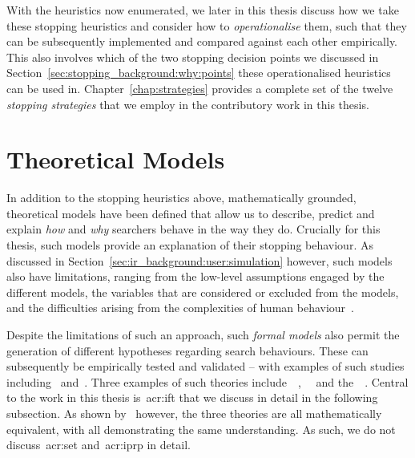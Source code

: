 With the heuristics now enumerated, we later in this thesis discuss how we take these stopping heuristics and consider how to \emph{operationalise} them, such that they can be subsequently implemented and compared against each other empirically. This also involves which of the two stopping decision points we discussed in Section~\ref{sec:stopping_background:why:points} these operationalised heuristics can be used in. Chapter~\ref{chap:strategies} provides a complete set of the twelve \emph{stopping strategies} that we employ in the contributory work in this thesis.

\section{Theoretical Models}\label{sec:stopping_background:theoretical}
In addition to the stopping heuristics above, mathematically grounded, theoretical models have been defined that allow us to describe, predict and explain \emph{how} and \emph{why} searchers behave in the way they do. Crucially for this thesis, such models provide an explanation of their stopping behaviour. As discussed in Section~\ref{sec:ir_background:user:simulation} however, such models also have limitations, ranging from the low-level assumptions engaged by the different models, the variables that are considered or excluded from the models, and the difficulties arising from the complexities of human behaviour~\citep{fishwick1995simulation, azzopardi2015theories}.

Despite the limitations of such an approach, such \emph{formal models} also permit the generation of different hypotheses regarding search behaviours. These can subsequently be empirically tested and validated -- with examples of such studies including~\cite{azzopardi2013query_cost} and~\cite{pirolli1996scatter_techniques}. Three examples of such theories include~~\citep{pirolli1999ift},~~\citep{azzopardi2011economics} and the~~\citep{fuhr2008iprp}. Central to the work in this thesis is~\gls{acr:ift} that we discuss in detail in the following subsection. As shown by~\cite{azzopardi2015theories} however, the three theories are all mathematically equivalent, with all demonstrating the same understanding. As such, we do not discuss~\gls{acr:set} and~\gls{acr:iprp} in detail.


